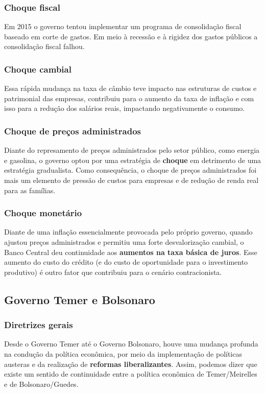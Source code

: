 \documentclass[11pt]{article}
\begin{document}
\subsubsection*{Choque fiscal}
\label{sec:org07feb97}

Em 2015 o governo tentou implementar um programa de consolidação fiscal baseado em corte de gastos. Em meio à recessão e à rigidez dos gastos públicos a consolidação fiscal falhou.
\subsubsection*{Choque cambial}
\label{sec:org337073d}
Essa rápida mudança na taxa de câmbio teve impacto nas estruturas de custos e patrimonial das empresas, contribuiu para o aumento da taxa de inflação e com isso para a redução dos salários reais, impactando negativamente o consumo.
\subsubsection*{Choque de preços administrados}
\label{sec:org9dadc5b}

Diante do represamento de preços administrados pelo setor público, como energia e gasolina, o governo optou por uma estratégia de \textbf{choque} em detrimento de uma estratégia gradualista. Como consequência, o choque de preços administrados foi mais um elemento de pressão de custos para empresas e de redução de renda real para as famílias.
\subsubsection*{Choque monetário}
\label{sec:org356910d}
Diante de uma inflação essencialmente provocada pelo próprio governo, quando ajustou preços administrados e permitiu uma forte desvalorização cambial, o Banco Central deu continuidade aos \textbf{aumentos na taxa básica de juros}. Esse aumento do custo do crédito (e do custo de oportunidade para o investimento produtivo) é outro fator que contribuiu para o cenário contracionista.


\subsection*{Governo Temer e Bolsonaro}
\label{sec:org62a8748}
\subsubsection*{Diretrizes gerais}
\label{sec:orgc718c37}
Desde o Governo Temer até o Governo Bolsonaro, houve uma mudança profunda na condução da política econômica, por meio da implementação de políticas austeras e da realização de \textbf{reformas liberalizantes}. Assim, podemos dizer que existe um sentido de continuidade entre a política econômica de Temer/Meirelles e de Bolsonaro/Guedes.
\end{document}
